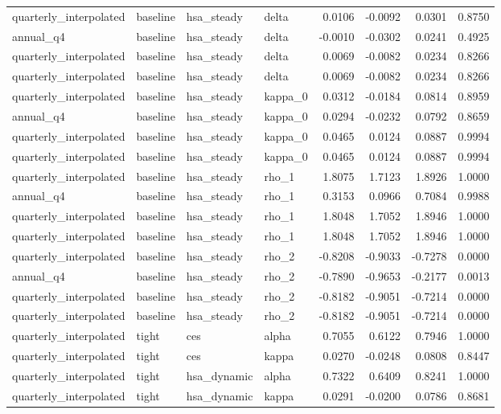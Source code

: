 \begin{tabular}{llllrrrr}
quarterly\_interpolated & baseline & hsa\_steady & delta & 0.0106 & -0.0092 & 0.0301 & 0.8750 \\
annual\_q4 & baseline & hsa\_steady & delta & -0.0010 & -0.0302 & 0.0241 & 0.4925 \\
quarterly\_interpolated & baseline & hsa\_steady & delta & 0.0069 & -0.0082 & 0.0234 & 0.8266 \\
quarterly\_interpolated & baseline & hsa\_steady & delta & 0.0069 & -0.0082 & 0.0234 & 0.8266 \\
quarterly\_interpolated & baseline & hsa\_steady & kappa\_0 & 0.0312 & -0.0184 & 0.0814 & 0.8959 \\
annual\_q4 & baseline & hsa\_steady & kappa\_0 & 0.0294 & -0.0232 & 0.0792 & 0.8659 \\
quarterly\_interpolated & baseline & hsa\_steady & kappa\_0 & 0.0465 & 0.0124 & 0.0887 & 0.9994 \\
quarterly\_interpolated & baseline & hsa\_steady & kappa\_0 & 0.0465 & 0.0124 & 0.0887 & 0.9994 \\
quarterly\_interpolated & baseline & hsa\_steady & rho\_1 & 1.8075 & 1.7123 & 1.8926 & 1.0000 \\
annual\_q4 & baseline & hsa\_steady & rho\_1 & 0.3153 & 0.0966 & 0.7084 & 0.9988 \\
quarterly\_interpolated & baseline & hsa\_steady & rho\_1 & 1.8048 & 1.7052 & 1.8946 & 1.0000 \\
quarterly\_interpolated & baseline & hsa\_steady & rho\_1 & 1.8048 & 1.7052 & 1.8946 & 1.0000 \\
quarterly\_interpolated & baseline & hsa\_steady & rho\_2 & -0.8208 & -0.9033 & -0.7278 & 0.0000 \\
annual\_q4 & baseline & hsa\_steady & rho\_2 & -0.7890 & -0.9653 & -0.2177 & 0.0013 \\
quarterly\_interpolated & baseline & hsa\_steady & rho\_2 & -0.8182 & -0.9051 & -0.7214 & 0.0000 \\
quarterly\_interpolated & baseline & hsa\_steady & rho\_2 & -0.8182 & -0.9051 & -0.7214 & 0.0000 \\
quarterly\_interpolated & tight & ces & alpha & 0.7055 & 0.6122 & 0.7946 & 1.0000 \\
quarterly\_interpolated & tight & ces & kappa & 0.0270 & -0.0248 & 0.0808 & 0.8447 \\
quarterly\_interpolated & tight & hsa\_dynamic & alpha & 0.7322 & 0.6409 & 0.8241 & 1.0000 \\
quarterly\_interpolated & tight & hsa\_dynamic & kappa & 0.0291 & -0.0200 & 0.0786 & 0.8681 \\

\end{tabular}
